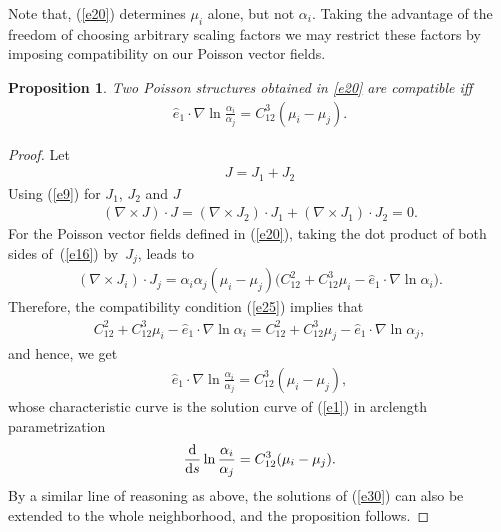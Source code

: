 \documentclass[10pt,a4paper]{amsart}
\numberwithin{equation}{section}
\newtheorem{Proposition}[Theorem]{Proposition}
 { \theoremstyle{definition}
\newtheorem{Definition}[Theorem]{Definition} }
\begin{document}
Note that, (\ref{e20}) determines $\mu _{i}$ alone, but not $\alpha _{i}$. Taking the advantage of the freedom of choosing arbitrary scaling factors we may restrict these factors by imposing compatibility on our Poisson vector f\/ields.

\begin{Proposition}\label{proposition2}
Two Poisson structures obtained in \eqref{e20} are compatible iff
\begin{gather}
\widehat{e}_{1}\cdot \nabla \ln \frac{\alpha _{i}}{\alpha _{j}}=C_{12}^{3} ( \mu _{i}-\mu _{j} ). \label{e23}
\end{gather}
\end{Proposition}

\begin{proof} Let
\begin{gather*}
J=J_{1}+J_{2}
\end{gather*}
Using (\ref{e9}) for $J_{1}$, $J_{2}$ and $J$
\begin{gather}
( \nabla \times J) \cdot J=( \nabla \times J_{2})\cdot J_{1}+ ( \nabla \times J_{1} ) \cdot J_{2}=0. \label{e25}
\end{gather}
For the Poisson vector f\/ields def\/ined in (\ref{e20}), taking the dot product of both sides of~(\ref{e16}) by~$J_{j}$, leads to
\begin{gather}
( \nabla \times J_{i}) \cdot J_{j}=\alpha _{i}\alpha_{j} (\mu _{i}-\mu _{j} ) \big( C_{12}^{2}+C_{12}^{3}\mu _{i}-\widehat{e}_{1}\cdot \nabla \ln \alpha _{i}\big). \label{e27}
\end{gather}
Therefore, the compatibility condition (\ref{e25}) implies that
\begin{gather*}
C_{12}^{2}+C_{12}^{3}\mu _{i}-\widehat{e}_{1}\cdot \nabla \ln \alpha_{i}=C_{12}^{2}+C_{12}^{3}\mu _{j}-\widehat{e}_{1}\cdot \nabla \ln \alpha_{j},
\end{gather*}
and hence, we get
\begin{gather}
\widehat{e}_{1}\cdot \nabla \ln \frac{\alpha _{i}}{\alpha _{j}}=C_{12}^{3}( \mu _{i}-\mu _{j}), \label{e29}
\end{gather}
whose characteristic curve is the solution curve of (\ref{e1}) in arclength parametrization
\begin{gather}
\frac{{\rm d}}{{\rm d}s}\ln \frac{\alpha _{i}}{\alpha _{j}}=C_{12}^{3} ( \mu_{i}-\mu _{j} ). \label{e30}
\end{gather}
By a similar line of reasoning as above, the solutions of (\ref{e30}) can also be extended to the whole neighborhood, and the proposition follows.
\end{proof}
\end{document}
